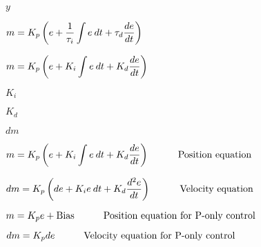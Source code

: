 \documentclass[12pt,a4paper,margin=2cm]{book}
\def\lthtmlcheckvsize{\ifdim\ht\sizebox<\vsize 
  \ifdim\wd\sizebox<\hsize\expandafter\hfill\fi \expandafter\vfill
  \else\expandafter\vss\fi}%
\begin{document}
{\newpage\clearpage
{}%
$ y$%
\lthtmlindisplaymathZ
\lthtmlcheckvsize\clearpage}

{\newpage\clearpage
{}%
$\displaystyle m = K_p \left(e + {1 \over \tau_i} \int e \> dt + \tau_d {de \over dt} \right)$%
\lthtmlindisplaymathZ
\lthtmlcheckvsize\clearpage}

{\newpage\clearpage
{}%
$\displaystyle m = K_p \left(e + K_i \int e \> dt + K_d {de \over dt} \right)$%
\lthtmlindisplaymathZ
\lthtmlcheckvsize\clearpage}

{\newpage\clearpage
{}%
$ K_i$%
\lthtmlindisplaymathZ
\lthtmlcheckvsize\clearpage}

{\newpage\clearpage
{}%
$ K_d$%
\lthtmlindisplaymathZ
\lthtmlcheckvsize\clearpage}

{\newpage\clearpage
{}%
$ dm$%
\lthtmlindisplaymathZ
\lthtmlcheckvsize\clearpage}

{\newpage\clearpage
{}%
$\displaystyle m = K_p \left(e + K_i \int e \> dt + K_d {de \over dt} \right) \hskip 30pt \hbox{Position equation}$%
\lthtmlindisplaymathZ
\lthtmlcheckvsize\clearpage}

{\newpage\clearpage
{}%
$\displaystyle dm = K_p \left(de + K_i  e \> dt + K_d {d^2e \over dt} \right) \hskip 30pt \hbox{Velocity equation}$%
\lthtmlindisplaymathZ
\lthtmlcheckvsize\clearpage}

{\newpage\clearpage
{}%
$\displaystyle m = K_p e + \hbox{Bias} \hskip 30pt \hbox{Position equation for P-only control}$%
\lthtmlindisplaymathZ
\lthtmlcheckvsize\clearpage}

{\newpage\clearpage
{}%
$\displaystyle dm = K_p de \hskip 30pt \hbox{Velocity equation for P-only control}$%
\lthtmlindisplaymathZ
\lthtmlcheckvsize\clearpage}
\end{document}
